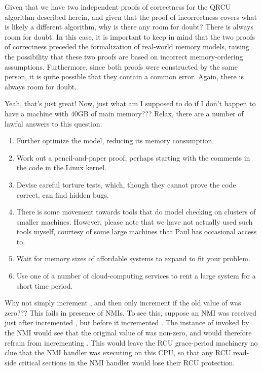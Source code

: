 \QuickQ{}
	Given that we have two independent proofs of correctness for
	the QRCU algorithm described herein, and given that the
	proof of incorrectness covers what is likely a different
	algorithm, why is there any room for doubt?
\QuickA{}
	There is always room for doubt.
	In this case, it is important to keep in mind that the two proofs
	of correctness preceded the formalization of real-world memory
	models, raising the possibility that these two proofs are based
	on incorrect memory-ordering assumptions.
	Furthermore, since both proofs were constructed by the same person,
	it is quite possible that they contain a common error.
	Again, there is always room for doubt.

\QuickQ{}
	Yeah, that's just great!
	Now, just what am I supposed to do if I don't happen to have a
	machine with 40GB of main memory???
\QuickA{}
	Relax, there are a number of lawful answers to
	this question:
	\begin{enumerate}
	\item	Further optimize the model, reducing its memory consumption.
	\item	Work out a pencil-and-paper proof, perhaps starting with the
		comments in the code in the Linux kernel.
	\item	Devise careful torture tests, which, though they cannot prove
		the code correct, can find hidden bugs.
	\item	There is some movement towards tools that do model
		checking on clusters of smaller machines.
		However, please note that we have not actually used such
		tools myself, courtesy of some large machines that Paul has
		occasional access to.
	\item	Wait for memory sizes of affordable systems to expand
		to fit your problem.
	\item	Use one of a number of cloud-computing services to rent
		a large system for a short time period.
	\end{enumerate}

\QuickQ{}
	Why not simply increment , and then only
	increment  if the old value
	of  was zero???
\QuickA{}
	This fails in presence of NMIs.
	To see this, suppose an NMI was received just after
	 incremented ,
	but before it incremented .
	The instance of  invoked by the NMI
	would see that the original value of 
	was non-zero, and would therefore refrain from incrementing
	.
	This would leave the RCU grace-period machinery no clue that the
	NMI handler was executing on this CPU, so that any RCU read-side
	critical sections in the NMI handler would lose their RCU protection.

